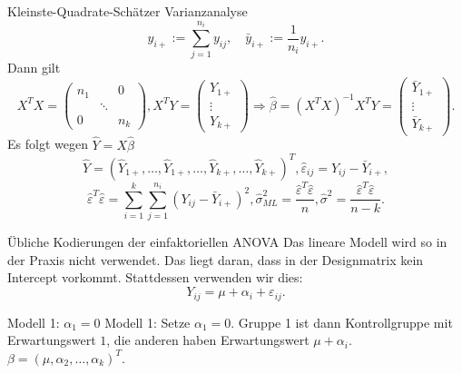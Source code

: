 \begin{karte}{Kleinste-Quadrate-Schätzer Varianzanalyse}
\[y_{i+} := \sum_{j=1}^{n_i} y_{ij}, \quad \bar{y}_{i+} := \frac{1}{n_i} y_{i+}. \]
Dann gilt 
\[ X^T X = \begin{pmatrix}
    n_1 & & 0 \\
    & \ddots & \\
    0 & & n_k
\end{pmatrix}, X^T Y = \begin{pmatrix}
    Y_{1+} \\ \vdots \\ Y_{k+}
\end{pmatrix} \Rightarrow \hat{\beta} = (X^T X)^{-1} X^T Y = \begin{pmatrix}
    \bar{Y}_{1+} \\ \vdots \\ \bar{Y}_{k+}
\end{pmatrix}. \]
Es folgt wegen \(\hat{Y} = X \hat{\beta}\)
\[ \hat{Y} = (\hat{Y}_{1+}, \ldots, \hat{Y}_{1+}, \ldots, \hat{Y}_{k+}, \ldots, \hat{Y}_{k+})^T, \hat{\varepsilon}_{ij} = Y_{ij} - \bar{Y}_{i+}, \]
\[ \hat{\varepsilon}^T \hat{\varepsilon} = \sum_{i=1}^k \sum_{j=1}^{n_i} (Y_{ij} - \bar{Y}_{i+})^2, \hat{\sigma}_{ML}^2 = \frac{\hat{\varepsilon}^T \hat{\varepsilon}}{n}, \hat{\sigma}^2 = \frac{\hat{\varepsilon}^T \hat{\varepsilon}}{n-k}. \]
\end{karte}

\begin{karte}{Übliche Kodierungen der einfaktoriellen ANOVA}
Das lineare Modell wird so in der Praxis nicht verwendet. Das liegt daran, dass in der Designmatrix kein Intercept vorkommt. 
Stattdessen verwenden wir dies: 
\[ Y_{ij} = \mu + \alpha_i + \varepsilon_{ij}. \]
\end{karte}

\begin{karte}{Modell 1: \(\alpha_1 = 0\)}
Modell 1: Setze \(\alpha_1 = 0\). Gruppe 1 ist dann Kontrollgruppe mit Erwartungswert \(1\), die anderen haben Erwartungswert \(\mu + \alpha_i\).
\(\beta = (\mu, \alpha_2, \ldots, \alpha_k)^T\).
\end{karte}

